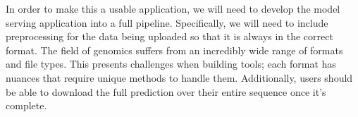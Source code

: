 \documentclass{sig-alternate-05-2015}
\begin{document}
In order to make this a usable application, we will need to develop the model serving application into a full pipeline. Specifically, we will need to include preprocessing for the data being uploaded so that it is always in the correct format. The field of genomics suffers from an incredibly wide range of formats and file types. This presents challenges when building tools; each format has nuances that require unique methods to handle them. Additionally, users should be able to download the full prediction over their entire sequence once it's complete.



\end{document}
